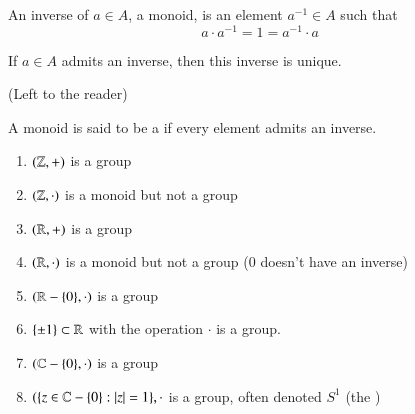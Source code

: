 \documentclass[12pt, a4paper, twoside, openright, titlepage]{book}
\begin{document}
\begin{appendices}
    \begin{defn}{}{}
        An inverse of $a \in A$, a monoid, is an element $a^{-1} \in A$ such that \begin{equation}
            a\cdot a^{-1} = 1 = a^{-1} \cdot a
        \end{equation}
    \end{defn}
    
    \begin{lem}{}{}
        If $a \in A$ admits an inverse, then this inverse is unique.
        \begin{proof*}{}{}
            (Left to the reader)
        \end{proof*}
    \end{lem}
    
    \begin{defn}{}{}
        A monoid is said to be a  if every element admits an inverse.
    \end{defn}
    
    \begin{eg}{}{}
        \leavevmode
        \begin{enumerate}
            \item $(\mathbb Z,+)$ is a group
            \item $(\mathbb Z,\cdot)$ is a monoid but not a group
            \item $(\mathbb R,+)$ is a group
            \item $(\mathbb R,\cdot)$ is a monoid but not a group ($0$ doesn't have an inverse)
            \item $(\mathbb R-\{0\},\cdot)$ is a group
            \item $\{\pm 1\} \subset \mathbb R$ with the operation $\cdot$ is a group.
            \item $(\mathbb C-\{0\},\cdot)$ is a group
            \item $(\{z\in \mathbb C-\{0\}:|z| = 1\},\cdot$ is a group, often denoted $S^1$ (the )
        \end{enumerate}
    \end{eg}
    

\end{appendices}
\end{document}
